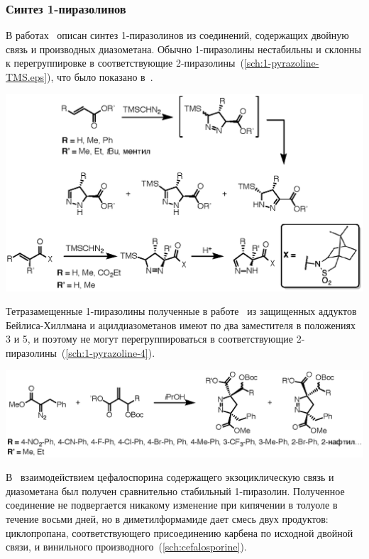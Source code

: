 \subsubsection{Синтез 1-пиразолинов}
В работах~\cite{Baldwin1990, Mish1997, Simovic2007, Sun2013} описан синтез 1-пиразолинов из соединений, содержащих двойную связь и производных диазометана.
Обычно 1-пиразолины нестабильны и склонны к перегруппировке в соответствующие 2-пиразолины~(\ref{sch:1-pyrazoline-TMS.eps}), что было показано в~\cite{Mish1997, Simovic2007}.

\begin{scheme}
    \centering
    \includegraphics{sections/literature/img/1-pyrazoline-TMS.eps}
    \caption{}
    \label{sch:1-pyrazoline-TMS.eps}
\end{scheme}


Тетразамещенные 1-пиразолины полученные в работе~\cite{Sun2013} из защищенных аддуктов Бейлиса-Хиллмана и ацилдиазометанов имеют по два заместителя в положениях 3 и 5, и поэтому не могут перегруппироваться в соответствующие 2-пиразолины~(\ref{sch:1-pyrazoline-4}).

\begin{scheme}
    \centering
    \includegraphics{sections/literature/img/1-pyrazoline-4.eps}
    \caption{}
    \label{sch:1-pyrazoline-4}
\end{scheme}


В~\cite{Baldwin1990} взаимодействием цефалоспорина содержащего экзоциклическую связь и диазометана был получен сравнительно стабильный 1-пиразолин.
Полученное соединение не подвергается никакому изменение при кипячении в толуоле в течение восьми дней, но в диметилформамиде дает смесь двух продуктов: циклопропана, соответствующего присоединению карбена по исходной двойной связи, и винильного производного~(\ref{sch:cefalosporine}).

